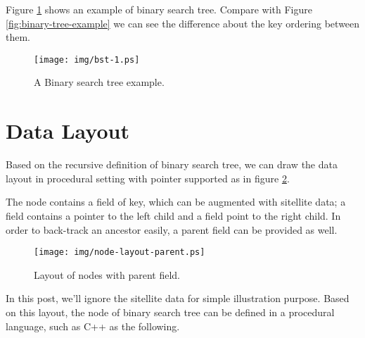 \documentclass{article}
\begin{document}
Figure \ref{fig:bst-example} shows an example of binary search tree. Compare with
Figure \ref{fig:binary-tree-example} we can see the difference about the key 
ordering between them.

\begin{figure}[htbp]
       \begin{center}
        \texttt{[image: img/bst-1.ps]}
        \caption{A Binary search tree example.} \label{fig:bst-example}
       \end{center}
\end{figure}


\section{Data Layout}

Based on the recursive definition of binary search tree, we can draw the 
data layout in procedural setting with pointer supported as in figure
\ref{fig:node-layout-parent}.


The node contains a field of key, which can be augmented with sitellite
data; a field contains a pointer to the left child and a field point to
the right child. In order to back-track an ancestor easily, a parent
field can be provided as well. 

\begin{figure}[htbp]
       \begin{center}
        \texttt{[image: img/node-layout-parent.ps]}
        \caption{Layout of nodes with parent field.} \label{fig:node-layout-parent}
       \end{center}
\end{figure}

In this post, we'll ignore the sitellite data for simple illustration purpose.
Based on this layout, the node of binary search tree can be defined in a procedural
language, such as C++ as the following.
\end{document}

